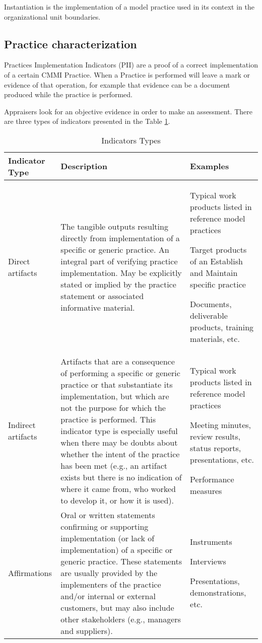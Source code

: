 Instantiation is the implementation of a model practice used in its context in the organizational unit boundaries.

\subsection{Practice characterization}
Practices Implementation Indicators (PII) are a proof of  a correct implementation of a certain CMMI Practice. When a Practice is performed will leave a mark or evidence of that operation, for example that evidence can be a document produced while the practice is performed.

Appraisers look for an objective evidence in order to make an assessment. There are three types of indicators presented in the Table \ref{tab:Indicator}.


\begin{table}[h]
	\centering
	\caption{Indicators Types}
\begin{tabular}{|p{2cm}|p{7cm}|p{4cm}|}
	\hline Indicator Type & Description & Examples\\
	\hline Direct artifacts & The tangible outputs resulting directly 
	from implementation of a specific or 
	generic practice. An integral part of 
	verifying practice implementation. May 
	be explicitly stated or implied by the 
	practice statement or associated 
	informative material. & Typical work products listed 
	in reference model practices 
	
	Target products of an 
	Establish and Maintain specific practice 
	
	Documents, deliverable 
	products, training materials, 
	etc. \\ 
	\hline Indirect artifacts & Artifacts that are a consequence of 
	performing a specific or generic practice 
	or that substantiate its implementation, 
	but which are not the purpose for which 
	the practice is performed. This indicator 
	type is especially useful when there may 
	be doubts about whether the intent of the 
	practice has been met (e.g., an artifact 
	exists but there is no indication of where 
	it came from, who worked to develop it, 
	or how it is used).  & Typical work products listed 
	in reference model practices 
	
	Meeting minutes, review 
	results, status reports, 
	presentations, etc. 
	
	Performance measures \\ 
	\hline Affirmations & Oral or written statements confirming or 
	supporting implementation (or lack of 
	implementation) of a specific or generic 
	practice. These statements are usually 
	provided by the implementers of the 
	practice and/or internal or external 
	customers, but may also include other 
	stakeholders (e.g., managers and 
	suppliers). &  Instruments 
	
	Interviews 
	
	Presentations, 
	demonstrations, etc.\\ 
	\hline 
\end{tabular}
\label{tab:Indicator}
\end{table}

